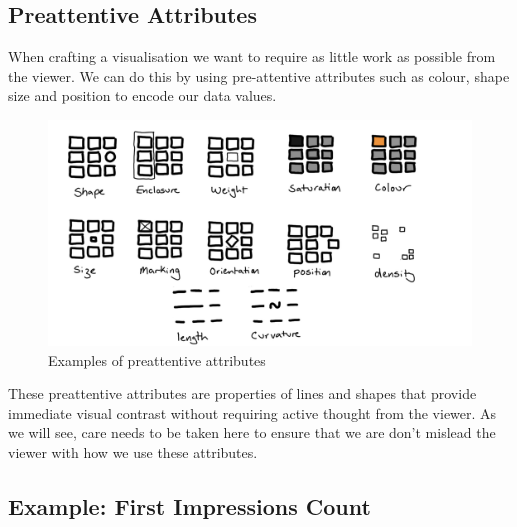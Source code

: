 \documentclass[
  letterpaper,
  DIV=11,
  numbers=noendperiod]{scrreprt}
\begin{document}
\subsection{Preattentive Attributes}\label{preattentive-attributes}

When crafting a visualisation we want to require as little work as
possible from the viewer. We can do this by using pre-attentive
attributes such as colour, shape size and position to encode our data
values.

\begin{figure}[H]

{\centering \includegraphics[width=1\textwidth,height=\textheight]{images/303-data-visualisation/preattentive-attributes.png}

}

\caption{Examples of preattentive attributes}

\end{figure}%

These preattentive attributes are properties of lines and shapes that
provide immediate visual contrast without requiring active thought from
the viewer. As we will see, care needs to be taken here to ensure that
we are don't mislead the viewer with how we use these attributes.

\subsection{Example: First Impressions
Count}\label{example-first-impressions-count}
\end{document}

